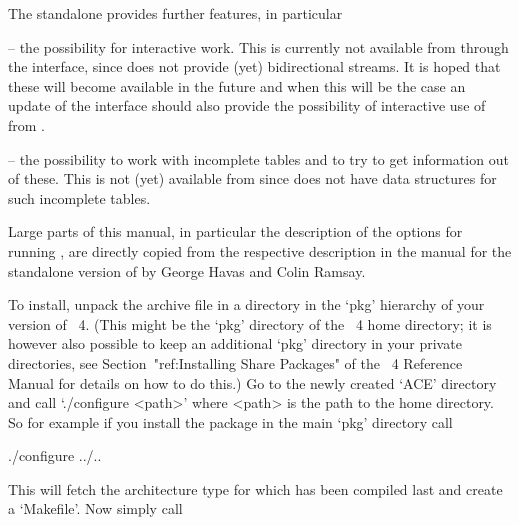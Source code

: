 The  {\ACE} standalone  provides further  features, in  particular 

\beginlist

\item{--} the possibility for  interactive work. This is currently not
available  from {\GAP} through  the interface,  since {\GAP}  does not
provide  (yet) bidirectional  streams.  It is  hoped  that these  will
become  available in  the future  and when  this will  be the  case an
update  of  the  interface  should  also provide  the  possibility  of
interactive use of {\ACE} from {\GAP}.

\item{--} the possibility to work with incomplete tables and to try to
get information out of these.  This is not (yet) available from {\GAP}
since {\GAP} does not have data structures for such incomplete tables.

\endlist




Large parts of  this manual, in particular      the description of the
options for  running {\ACE}, are  directly copied from  the respective
description in  the manual \cite{HR99a} for the  standalone version of
{\ACE} by George Havas and Colin Ramsay.



To  install, unpack  the  archive file  in  a directory  in the  `pkg'
hierarchy  of your  version  of  {\GAP}~4. (This  might  be the  `pkg'
directory of the {\GAP}~4 home  directory; it is however also possible
to keep an additional `pkg' directory in your private directories, see
Section~"ref:Installing  Share Packages"  of  the {\GAP}~4   Reference
Manual for details  on how to do this.) Go to  the newly created `ACE'
directory and  call `./configure <path>'  where <path> is the  path to
the {\GAP} home  directory. So for example if  you install the package
in the main `pkg' directory call

\begintt
./configure ../..
\endtt

This  will fetch  the  architecture  type for  which  {\GAP} has  been
compiled last and create a `Makefile'. Now simply call

